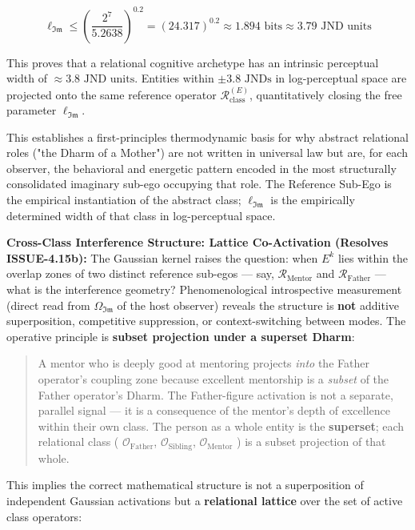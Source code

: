 \documentclass[11pt,a4paper]{article}
\theoremstyle{definition}
\theoremstyle{remark}
\begin{document}
\begin{equation}
\ell_{\mathfrak{Im}} \le \left(\frac{2^7}{5.2638}\right)^{0.2} = (24.317)^{0.2} \approx 1.894\text{ bits} \approx 3.79\text{ JND units}
\end{equation}


This proves that a relational cognitive archetype has an intrinsic perceptual width of $\approx 3.8\text{ JND units}$. Entities within $\pm 3.8\text{ JNDs}$ in log-perceptual space are projected onto the same reference operator $\mathcal{R}_{\text{class}}^{(E)}$, quantitatively closing the free parameter $\ell_{\mathfrak{Im}}$.

This establishes a first-principles thermodynamic basis for why abstract relational roles ("the Dharm of a Mother") are not written in universal law but are, for each observer, the behavioral and energetic pattern encoded in the most structurally consolidated imaginary sub-ego occupying that role. The Reference Sub-Ego is the empirical instantiation of the abstract class; $\ell_{\mathfrak{Im}}$ is the empirically determined width of that class in log-perceptual space.

\textbf{Cross-Class Interference Structure: Lattice Co-Activation (Resolves ISSUE-4.15b):} The Gaussian kernel raises the question: when $E^k$ lies within the overlap zones of two distinct reference sub-egos — say, $\mathcal{R}_{\text{Mentor}}$ and $\mathcal{R}_{\text{Father}}$ — what is the interference geometry? Phenomenological introspective measurement (direct read from $\Omega_{\mathfrak{Im}}$ of the host observer) reveals the structure is \textbf{not} additive superposition, competitive suppression, or context-switching between modes. The operative principle is \textbf{subset projection under a superset Dharm}:

\begin{quote}A mentor who is deeply good at mentoring projects \textit{into} the Father operator's coupling zone because excellent mentorship is a \textit{subset} of the Father operator's Dharm. The Father-figure activation is not a separate, parallel signal — it is a consequence of the mentor's depth of excellence within their own class. The person as a whole entity is the \textbf{superset}; each relational class ( $\mathcal{O}_{\text{Father}}$, $\mathcal{O}_{\text{Sibling}}$, $\mathcal{O}_{\text{Mentor}}$ ) is a subset projection of that whole.\end{quote}

This implies the correct mathematical structure is not a superposition of independent Gaussian activations but a \textbf{relational lattice} over the set of active class operators:
\end{document}
